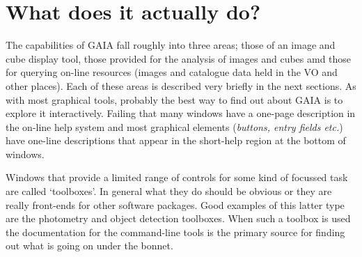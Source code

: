 \documentclass[twoside,11pt]{article}
\newcommand{\xlabel}[1]{}
\renewcommand{\_}{\texttt{\symbol{95}}}
\begin{document}
\section{\xlabel{what_does_it_actually_do}What does it actually do?}

The capabilities of GAIA fall roughly into three areas; those of an
image and cube display tool, those provided for the analysis of images
and cubes amd those for querying on-line resources (images and catalogue
data held in the VO and other places). Each of these areas is described
very briefly in the next sections. As with most graphical tools,
probably the best way to find out about GAIA is to explore it
interactively. Failing that many windows have a one-page description in
the on-line help system and most graphical elements (\textit{buttons,
entry fields etc.}) have one-line descriptions that appear in the
short-help region at the bottom of windows.

Windows that provide a limited range of controls for some kind of
focussed task are called `toolboxes'. In general what they do should
be obvious or they are really front-ends for other software
packages. Good examples of this latter type are the photometry and
object detection toolboxes. When such a toolbox is used the
documentation for the command-line tools is the primary source for
finding out what is going on under the bonnet.
\end{document}
